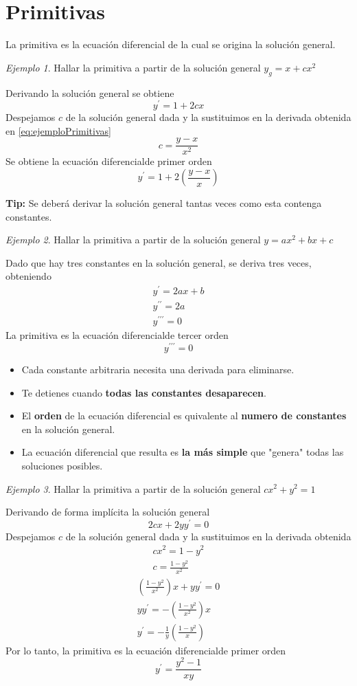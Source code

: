 \documentclass[12pt]{article} %
\theoremstyle{remark} %
\newtheorem{ejemplo}{Ejemplo}[section]
\newcommand{\ed}{ecuación diferencial}
\begin{document}
\section{Primitivas}
La primitiva es la ecuación diferencial de la cual se origina la solución general.
\begin{ejemplo}
  Hallar la primitiva a partir de la solución general $y_g = x + cx^2$

  Derivando la solución general se obtiene 
  \begin{equation}
    y^{\prime} = 1 + 2cx
    \label{eq:ejemploPrimitivas}
  \end{equation}
  Despejamos $c$ de la solución general dada y la sustituimos en la derivada obtenida en \ref{eq:ejemploPrimitivas}
  \[ c = \frac{y - x}{x^2} \]
  Se obtiene la \ed de primer orden \[ y^{\prime} = 1 + 2 \left( \frac{y-x}{x} \right) \]
\end{ejemplo}
\textbf{Tip:} Se deberá derivar la solución general tantas veces como esta contenga constantes.
\begin{ejemplo}
  Hallar la primitiva a partir de la solución general $y = ax^2 + bx + c$

  Dado que hay tres constantes en la solución general, se deriva tres veces, obteniendo
  \begin{gather*}
    y^{\prime} = 2ax + b\\
    y^{\prime \prime} = 2a\\
    y^{\prime \prime \prime} = 0
  \end{gather*}
  La primitiva es la \ed de tercer orden \[ y^{\prime \prime \prime} = 0\]
\end{ejemplo}
\begin{itemize}
  \item Cada constante arbitraria necesita una derivada para eliminarse.
  \item Te detienes cuando \textbf{todas las constantes desaparecen}.
  \item El \textbf{orden} de la ecuación diferencial es quivalente al \textbf{numero de constantes} en la solución general.
  \item La ecuación diferencial que resulta es \textbf{la más simple} que "genera" todas las soluciones posibles.
\end{itemize}
\begin{ejemplo}
Hallar la primitiva a partir de la solución general $cx^2 + y^2 = 1$

Derivando de forma implícita la solución general \[ 2cx + 2yy^{\prime} = 0 \]
Despejamos $c$ de la solución general dada y la sustituimos en la derivada obtenida
\begin{gather*}
  cx^2 = 1 - y^2\\
  c = \frac{1 - y^2}{x^2}
\end{gather*}
\begin{gather*}
  \left( \frac{1 - y^2}{x^2} \right) x + yy^{\prime} = 0\\
  yy^{\prime} = - \left( \frac{1 - y^2}{x^2} \right) x\\
  y^{\prime} = - \frac{1}{y} \left( \frac{1 - y^2}{x} \right)
\end{gather*}
Por lo tanto, la primitiva es la \ed de primer orden \[ y^{\prime} = \frac{y^2 - 1}{xy} \]
\end{ejemplo}
\end{document}
